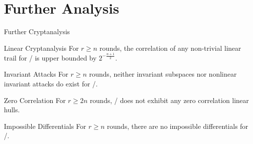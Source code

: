\section{Further Analysis}
\begin{frame}{Further Cryptanalysis}
    \begin{minipage}[t][70pt][t]{0.47\textwidth}
        \begin{block}{Linear Cryptanalysis\vpPp}
            For $r \geqslant n$ rounds, the correlation of any non-trivial linear trail for \bison/ is upper bounded by $2^{-\frac{n+1}{2}}$.
        \end{block}
    \end{minipage}
    \hfill
    \begin{minipage}[t][70pt][t]{0.47\textwidth}
        \begin{block}{Invariant Attacks\vpPp}
            For $r \geqslant n$ rounds, neither invariant subspaces nor nonlinear invariant attacks do exist for \bison/.
        \end{block}
    \end{minipage}

    \begin{minipage}[t][70pt][t]{0.47\textwidth}
        \begin{block}{Zero Correlation\vpPp}
            For $r \geqslant 2n$ rounds, \bison/ does not exhibit any zero correlation linear hulls.
        \end{block}
    \end{minipage}
    \hfill
    \begin{minipage}[t][70pt][t]{0.47\textwidth}
        \begin{block}{Impossible Differentials\vpPp}
            For $r \geqslant n$ rounds, there are no impossible differentials for \bison/.
        \end{block}
    \end{minipage}
\end{frame}

